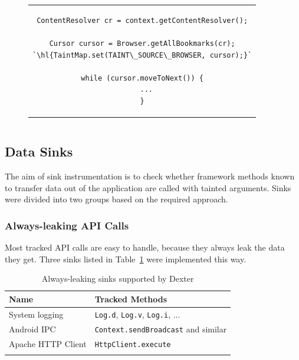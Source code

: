 \documentclass[12pt,twoside,notitlepage]{report}
\begin{document}
\begin{figure}[h]
	\centering
	\begin{tabular}{c}
	\begin{lstlisting}
ContentResolver cr = context.getContentResolver();

Cursor cursor = Browser.getAllBookmarks(cr);
`\hl{TaintMap.set(TAINT\_SOURCE\_BROWSER, cursor);}`

while (cursor.moveToNext()) {
  ...
}
	\end{lstlisting}
	\end{tabular}
	\begin{lstlisting}[caption={Code accessing browser bookmarks, with source instrumentation},
	                   label={listing:Source_Browser}]
	\end{lstlisting}
\end{figure}

\subsection{Data Sinks}

The aim of sink instrumentation is to check whether framework methods known to transfer data out of the application are called with tainted arguments. Sinks were divided into two groups based on the required approach.

\subsubsection{Always-leaking API Calls}

Most tracked API calls are easy to handle, because they always leak the data they get. Three sinks listed in Table~\ref{table:Sinks_AlwaysLeaking} were implemented this way.

\begin{table}[h]
	\begin{center}
	\begin{tabular}{|l|l|}
		\firsthline
		\textbf{Name}         & \textbf{Tracked Methods} \\
		\hline
		System logging        & \verb$Log.d$, \verb$Log.v$, \verb$Log.i$, ... \\
		Android IPC           & \verb$Context.sendBroadcast$ and similar \\
		Apache HTTP Client    & \verb$HttpClient.execute$ \\
		\lasthline
	\end{tabular}
	\end{center}
	\caption{Always-leaking sinks supported by Dexter}
	\label{table:Sinks_AlwaysLeaking}
\end{table}
\end{document}
